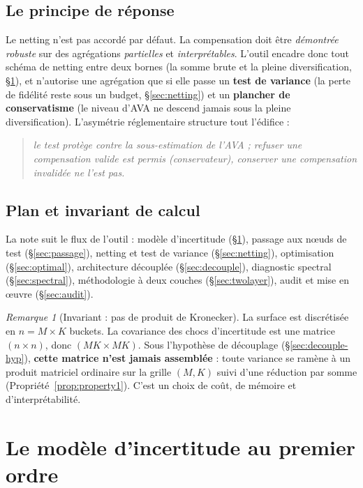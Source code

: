 \documentclass[11pt,a4paper]{article}
\theoremstyle{plain}
\theoremstyle{definition}
\theoremstyle{remark}
\newtheorem{remarque}[theoreme]{Remarque}
\begin{document}
\subsection{Le principe de réponse}
Le netting n'est pas accordé par défaut. La compensation doit être \emph{démontrée
robuste} sur des agrégations \emph{partielles} et \emph{interprétables}. L'outil
encadre donc tout schéma de netting entre deux bornes (la somme brute et la pleine
diversification, \S\ref{sec:modele}), et n'autorise une agrégation que si elle
passe un \textbf{test de variance} (la perte de fidélité reste sous un budget,
\S\ref{sec:netting}) et un \textbf{plancher de conservatisme} (le niveau d'AVA ne
descend jamais sous la pleine diversification). L'asymétrie réglementaire structure
tout l'édifice :
\begin{quote}\itshape
le test protège contre la \emph{sous}-estimation de l'AVA ; refuser une compensation
valide est permis (conservateur), conserver une compensation invalidée ne l'est pas.
\end{quote}

\subsection{Plan et invariant de calcul}
La note suit le flux de l'outil : modèle d'incertitude (\S\ref{sec:modele}), passage
aux nœuds de test (\S\ref{sec:passage}), netting et test de variance
(\S\ref{sec:netting}), optimisation (\S\ref{sec:optimal}), architecture découplée
(\S\ref{sec:decouple}), diagnostic spectral (\S\ref{sec:spectral}), méthodologie à
deux couches (\S\ref{sec:twolayer}), audit et mise en œuvre (\S\ref{sec:audit}).

\begin{remarque}[Invariant : pas de produit de Kronecker]
La surface est discrétisée en $n = M \times K$ buckets. La covariance des chocs
d'incertitude est une matrice $(n\times n)$, donc $(MK\times MK)$. Sous l'hypothèse
de découplage (\S\ref{sec:decouple-hyp}), \textbf{cette matrice n'est jamais
assemblée} : toute variance se ramène à un produit matriciel ordinaire sur la grille
$(M,K)$ suivi d'une réduction par somme (Propriété~\ref{prop:property1}). C'est un
choix de coût, de mémoire et d'interprétabilité.
\end{remarque}

\section{Le modèle d'incertitude au premier ordre}\label{sec:modele}
\end{document}
